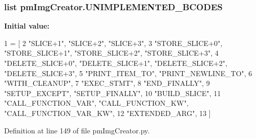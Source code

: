 \hypertarget{namespacepm_img_creator_a9ac0a3d15f856a2df38b2190c9af6674}{
\subsubsection[{U\-N\-I\-M\-P\-L\-E\-M\-E\-N\-T\-E\-D\-\_\-\-B\-C\-O\-D\-E\-S}]{\setlength{\rightskip}{0pt plus 5cm}list pm\-Img\-Creator.\-U\-N\-I\-M\-P\-L\-E\-M\-E\-N\-T\-E\-D\-\_\-\-B\-C\-O\-D\-E\-S}}\label{namespacepm_img_creator_a9ac0a3d15f856a2df38b2190c9af6674}
{\bfseries Initial value\-:}
\begin{DoxyCode}
1 = [
2     \textcolor{stringliteral}{"SLICE+1"}, \textcolor{stringliteral}{"SLICE+2"}, \textcolor{stringliteral}{"SLICE+3"},
3     \textcolor{stringliteral}{"STORE\_SLICE+0"}, \textcolor{stringliteral}{"STORE\_SLICE+1"}, \textcolor{stringliteral}{"STORE\_SLICE+2"}, \textcolor{stringliteral}{"STORE\_SLICE+3"},
4     \textcolor{stringliteral}{"DELETE\_SLICE+0"}, \textcolor{stringliteral}{"DELETE\_SLICE+1"}, \textcolor{stringliteral}{"DELETE\_SLICE+2"}, \textcolor{stringliteral}{"DELETE\_SLICE+3"},
5     \textcolor{stringliteral}{"PRINT\_ITEM\_TO"}, \textcolor{stringliteral}{"PRINT\_NEWLINE\_TO"},
6     \textcolor{stringliteral}{"WITH\_CLEANUP"},
7     \textcolor{stringliteral}{"EXEC\_STMT"},
8     \textcolor{stringliteral}{"END\_FINALLY"},
9     \textcolor{stringliteral}{"SETUP\_EXCEPT"}, \textcolor{stringliteral}{"SETUP\_FINALLY"},
10     \textcolor{stringliteral}{"BUILD\_SLICE"},
11     \textcolor{stringliteral}{"CALL\_FUNCTION\_VAR"}, \textcolor{stringliteral}{"CALL\_FUNCTION\_KW"}, \textcolor{stringliteral}{"CALL\_FUNCTION\_VAR\_KW"},
12     \textcolor{stringliteral}{"EXTENDED\_ARG"},
13     ]
\end{DoxyCode}


Definition at line 149 of file pm\-Img\-Creator.\-py.

